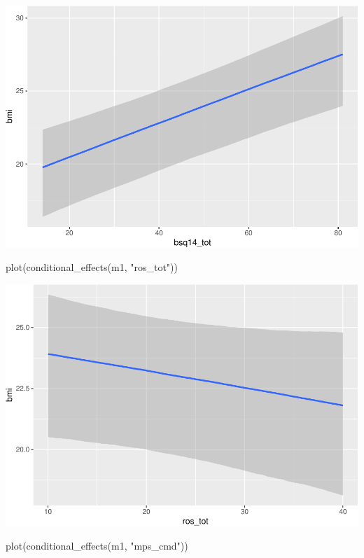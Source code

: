 \documentclass[
]{article}
\newenvironment{Shaded}{\begin{snugshade}}{\end{snugshade}}
\newcommand{\FunctionTok}[1]{\textcolor[rgb]{0.00,0.00,0.00}{#1}}
\newcommand{\NormalTok}[1]{#1}
\newcommand{\StringTok}[1]{\textcolor[rgb]{0.31,0.60,0.02}{#1}}
\begin{document}
\includegraphics{050_quest_groups_files/figure-latex/unnamed-chunk-1-4.pdf}

\begin{Shaded}
\begin{Highlighting}[]
\FunctionTok{plot}\NormalTok{(}\FunctionTok{conditional\_effects}\NormalTok{(m1, }\StringTok{"ros\_tot"}\NormalTok{))}
\end{Highlighting}
\end{Shaded}

\includegraphics{050_quest_groups_files/figure-latex/unnamed-chunk-1-5.pdf}

\begin{Shaded}
\begin{Highlighting}[]
\FunctionTok{plot}\NormalTok{(}\FunctionTok{conditional\_effects}\NormalTok{(m1, }\StringTok{"mps\_cmd"}\NormalTok{))}
\end{Highlighting}
\end{Shaded}
\end{document}

